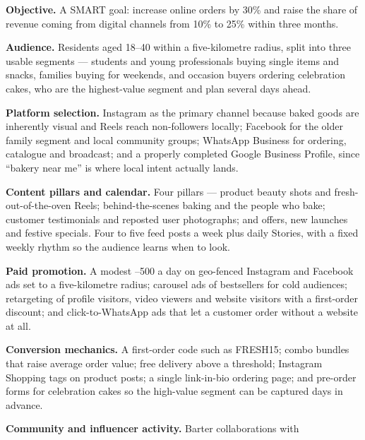 \begin{qlist}
\begin{apts}
\item \textbf{Objective.} A SMART goal: increase online orders by 30\% and
      raise the share of revenue coming from digital channels from 10\% to
      25\% within three months.
\item \textbf{Audience.} Residents aged 18--40 within a five-kilometre radius,
      split into three usable segments --- students and young professionals
      buying single items and snacks, families buying for weekends, and
      occasion buyers ordering celebration cakes, who are the highest-value
      segment and plan several days ahead.
\item \textbf{Platform selection.} Instagram as the primary channel because
      baked goods are inherently visual and Reels reach non-followers locally;
      Facebook for the older family segment and local community groups;
      WhatsApp Business for ordering, catalogue and broadcast; and a properly
      completed Google Business Profile, since ``bakery near me'' is where
      local intent actually lands.
\item \textbf{Content pillars and calendar.} Four pillars --- product beauty
      shots and fresh-out-of-the-oven Reels; behind-the-scenes baking and the
      people who bake; customer testimonials and reposted user photographs;
      and offers, new launches and festive specials. Four to five feed posts a
      week plus daily Stories, with a fixed weekly rhythm so the audience
      learns when to look.
\item \textbf{Paid promotion.} A modest --500 a day on geo-fenced
      Instagram and Facebook ads set to a five-kilometre radius; carousel ads
      of bestsellers for cold audiences; retargeting of profile visitors,
      video viewers and website visitors with a first-order discount; and
      click-to-WhatsApp ads that let a customer order without a website at all.
\item \textbf{Conversion mechanics.} A first-order code such as FRESH15;
      combo bundles that raise average order value; free delivery above a
      threshold; Instagram Shopping tags on product posts; a single
      link-in-bio ordering page; and pre-order forms for celebration cakes so
      the high-value segment can be captured days in advance.
\item \textbf{Community and influencer activity.} Barter collaborations with

\end{apts}
\end{qlist}
